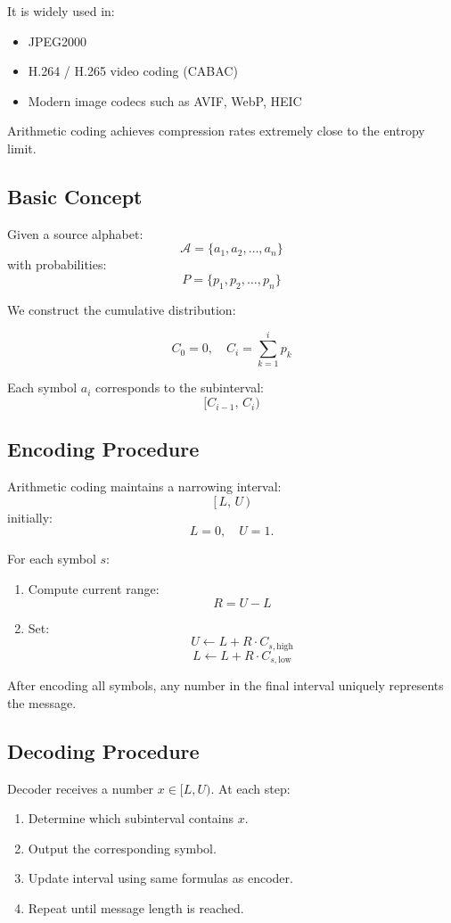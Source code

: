 \documentclass{AnantDocumentation}
\begin{document}
It is widely used in:
\begin{itemize}
\item JPEG2000
\item H.264 / H.265 video coding (CABAC)
\item Modern image codecs such as AVIF, WebP, HEIC
\end{itemize}

Arithmetic coding achieves compression rates extremely close to the entropy limit.

\subsection{Basic Concept}

Given a source alphabet:
\[
\mathcal{A} = \{a_1, a_2, \ldots, a_n\}
\]
with probabilities:
\[
P = \{p_1, p_2, \ldots, p_n\}
\]

We construct the cumulative distribution:

\[
C_0 = 0,\quad C_i = \sum_{k=1}^{i} p_k
\]

Each symbol \(a_i\) corresponds to the subinterval:
\[
[C_{i-1},\, C_i)
\]

\subsection{Encoding Procedure}

Arithmetic coding maintains a narrowing interval:
\[
[\,L,\, U\,)
\]
initially:
\[
L=0,\quad U=1.
\]

For each symbol \(s\):

\begin{enumerate}
\item Compute current range:
\[
R = U - L
\]
\item Set:
\[
U \leftarrow L + R \cdot C_{s,\text{high}}
\]
\[
L \leftarrow L + R \cdot C_{s,\text{low}}
\]
\end{enumerate}

After encoding all symbols, any number in the final interval uniquely represents the message.

\subsection{Decoding Procedure}

Decoder receives a number \(x \in [L, U)\).  
At each step:

\begin{enumerate}
\item Determine which subinterval contains \(x\).
\item Output the corresponding symbol.
\item Update interval using same formulas as encoder.
\item Repeat until message length is reached.
\end{enumerate}
\end{document}
